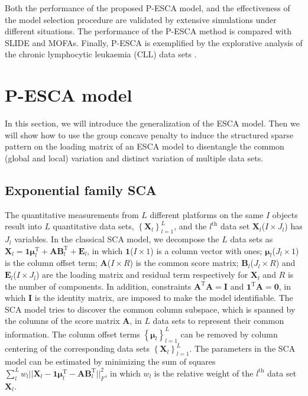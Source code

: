 Both the performance of the proposed P-ESCA model, and the effectiveness of the model selection procedure are validated by extensive simulations under different situations. The performance of the P-ESCA method is compared with SLIDE and MOFAs. Finally, P-ESCA is exemplified by the explorative analysis of the chronic lymphocytic leukaemia (CLL) data sets \cite{dietrich2018drug,argelaguet2018multi}.

\section{P-ESCA model} \label{section:5.2}
In this section, we will introduce the generalization of the ESCA model. Then we will show how to use the group concave penalty to induce the structured sparse pattern on the loading matrix of an ESCA model to disentangle the common (global and local) variation and distinct variation of multiple data sets.

\subsection{Exponential family SCA}
The quantitative measurements from $L$ different platforms on the same $I$ objects result into $L$ quantitative data sets, $\left\{\mathbf{X}_l \right\}_{l=1}^{L}$, and the $l^{\text{th}}$ data set $\mathbf{X}_l$($I \times J_l$) has $J_l$ variables. In the classical SCA model, we decompose the $L$ data sets as $\mathbf{X}_l = \mathbf{1}\bm{\mu}_l^{\text{T}} + \mathbf{AB}_l^{\text{T}} + \mathbf{E}_l$, in which $\mathbf{1}$($I\times 1$) is a column vector with ones; $\bm{\mu}_l$($J_l \times 1$) is the column offset term; $\mathbf{A}$($I\times R$) is the common score matrix; $\mathbf{B}_l$($J_l\times R$) and $\mathbf{E}_l$($I\times J_l$) are the loading matrix and residual term respectively for $\mathbf{X}_l$ and $R$ is the number of components. In addition, constraints $\mathbf{A}^{\text{T}}\mathbf{A} = \mathbf{I}$ and $\mathbf{1}^{\text{T}}\mathbf{A} = \mathbf{0}$, in which $\mathbf{I}$ is the identity matrix, are imposed to make the model identifiable. The SCA model tries to discover the common column subspace, which is spanned by the columns of the score matrix $\mathbf{A}$, in $L$ data sets to represent their common information. The column offset terms $\left\{ \bm{\mu}_l \right\}_{l=1}^{L}$ can be removed by column centering of the corresponding data sets $\left\{\mathbf{X}_l\right\}_{l=1}^{L}$. The parameters in the SCA model can be estimated by minimizing the sum of squares $\sum_{l}^{L} w_l ||\mathbf{X}_l - \mathbf{1}\bm{\mu}_l^{\text{T}} - \mathbf{AB}_l^{\text{T}}||_F^2$, in which $w_l$ is the relative weight of the $l^{\text{th}}$ data set $\mathbf{X}_l$.

